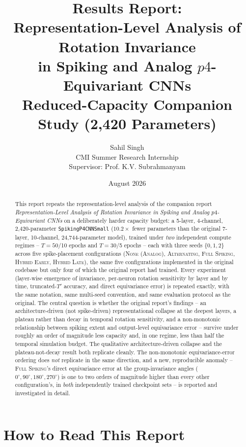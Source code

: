 \documentclass[11pt]{article}
\title{\Large Results Report:\\
Representation-Level Analysis of Rotation Invariance\\
in Spiking and Analog $p4$-Equivariant CNNs\\
\large Reduced-Capacity Companion Study (2{,}420 Parameters)}
\author{Sahil Singh\\
CMI Summer Research Internship\\
Supervisor: Prof. K.V. Subrahmanyam}
\date{August 2026}
\newcommand{\None}{\textsc{None (Analog)}}
\newcommand{\Alternating}{\textsc{Alternating}}
\newcommand{\FullSpiking}{\textsc{Full Spiking}}
\newcommand{\HybridLate}{\textsc{Hybrid Late}}
\newcommand{\HybridEarly}{\textsc{Hybrid Early}}
\begin{document}
\maketitle

\begin{abstract}
This report repeats the representation-level analysis of the companion report
\emph{Representation-Level Analysis of Rotation Invariance in Spiking and Analog $p4$-Equivariant
CNNs} on a deliberately harder capacity budget: a 5-layer, 4-channel, 2{,}420-parameter
\texttt{SpikingP4CNNSmall} ($10.2\times$ fewer parameters than the original 7-layer, 10-channel,
24{,}744-parameter model), trained under \emph{two} independent compute regimes -- $T=50$/10 epochs
and $T=30$/5 epochs -- each with three seeds $\{0,1,2\}$ across five spike-placement configurations
(\None, \Alternating, \FullSpiking, \HybridEarly, \HybridLate), the same five configurations
implemented in the original codebase but only four of which the original report had trained. Every
experiment (layer-wise emergence of invariance, per-neuron rotation sensitivity by layer and by time,
truncated-$T'$ accuracy, and direct equivariance error) is repeated exactly, with the same notation,
same multi-seed convention, and same evaluation protocol as the original. The central question is
whether the original report's findings -- an architecture-driven (not spike-driven) representational
collapse at the deepest layers, a plateau rather than decay in temporal rotation sensitivity, and a
non-monotonic relationship between spiking extent and output-level equivariance error -- survive
under roughly an order of magnitude less capacity and, in one regime, less than half the temporal
simulation budget. The qualitative architecture-driven collapse and the plateau-not-decay result both
replicate cleanly. The non-monotonic equivariance-error ordering does \emph{not} replicate in the same
direction, and a new, reproducible anomaly -- \FullSpiking's direct equivariance error at the
group-invariance angles ($0^\circ,90^\circ,180^\circ,270^\circ$) is one to two orders of magnitude
higher than every other configuration's, in \emph{both} independently trained checkpoint sets -- is
reported and investigated in detail.
\end{abstract}

\tableofcontents

\section{How to Read This Report}
\end{document}
